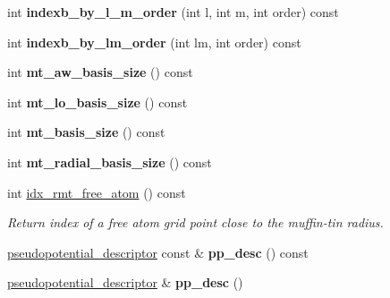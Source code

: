 \begin{DoxyCompactItemize}
\item 
\hypertarget{classsirius_1_1_atom__type_a201e3053715fb045685e16ddd3cee922}{}int {\bfseries indexb\+\_\+by\+\_\+l\+\_\+m\+\_\+order} (int l, int m, int order) const \label{classsirius_1_1_atom__type_a201e3053715fb045685e16ddd3cee922}

\item 
\hypertarget{classsirius_1_1_atom__type_a40aa40cf1a82c3935265c501c4980c5f}{}int {\bfseries indexb\+\_\+by\+\_\+lm\+\_\+order} (int lm, int order) const \label{classsirius_1_1_atom__type_a40aa40cf1a82c3935265c501c4980c5f}

\item 
\hypertarget{classsirius_1_1_atom__type_a7ad333f5727a9750c930fbc9e38d7103}{}int {\bfseries mt\+\_\+aw\+\_\+basis\+\_\+size} () const \label{classsirius_1_1_atom__type_a7ad333f5727a9750c930fbc9e38d7103}

\item 
\hypertarget{classsirius_1_1_atom__type_a7907c886df766c9f82ed6a5aecf5107c}{}int {\bfseries mt\+\_\+lo\+\_\+basis\+\_\+size} () const \label{classsirius_1_1_atom__type_a7907c886df766c9f82ed6a5aecf5107c}

\item 
\hypertarget{classsirius_1_1_atom__type_a008476e66c68f0b4de5d9c898fa9bc51}{}int {\bfseries mt\+\_\+basis\+\_\+size} () const \label{classsirius_1_1_atom__type_a008476e66c68f0b4de5d9c898fa9bc51}

\item 
\hypertarget{classsirius_1_1_atom__type_aed3d6a86a6704ce3d210e3cdbd1444f2}{}int {\bfseries mt\+\_\+radial\+\_\+basis\+\_\+size} () const \label{classsirius_1_1_atom__type_aed3d6a86a6704ce3d210e3cdbd1444f2}

\item 
int \hyperlink{classsirius_1_1_atom__type_a5448e50160cc68519c191df07aa338e7}{idx\+\_\+rmt\+\_\+free\+\_\+atom} () const 
\begin{DoxyCompactList}\small\item\em Return index of a free atom grid point close to the muffin-\/tin radius. \end{DoxyCompactList}\item 
\hypertarget{classsirius_1_1_atom__type_ac17ee616036c7ee90360423ab40bb0d8}{}\hyperlink{structpseudopotential__descriptor}{pseudopotential\+\_\+descriptor} const \& {\bfseries pp\+\_\+desc} () const \label{classsirius_1_1_atom__type_ac17ee616036c7ee90360423ab40bb0d8}

\item 
\hypertarget{classsirius_1_1_atom__type_ac282ffcd43b4b3147e24fde5b34d3e49}{}\hyperlink{structpseudopotential__descriptor}{pseudopotential\+\_\+descriptor} \& {\bfseries pp\+\_\+desc} ()\label{classsirius_1_1_atom__type_ac282ffcd43b4b3147e24fde5b34d3e49}


\end{DoxyCompactItemize}
